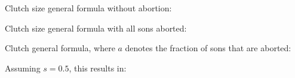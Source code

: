 \documentclass[11]{article}
\begin{document}
\bigskip

Clutch size general formula without abortion:



Clutch size general formula with all sons aborted:



Clutch general formula, where $a$ denotes the fraction of sons that are aborted:



Assuming $s=0.5$, this results in:


\end{document}
